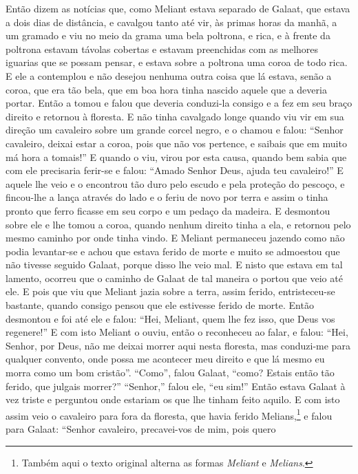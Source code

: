 Então dizem as notícias que, como Meliant estava separado de Galaat, que estava
a dois dias de distância, e cavalgou tanto até vir, às primas horas da manhã, a
um gramado e viu no meio da grama uma bela poltrona, e rica, e à frente da
poltrona estavam távolas cobertas e estavam preenchidas com as melhores
iguarias que se possam pensar, e estava sobre a poltrona uma coroa de todo
rica. E ele a contemplou e não desejou nenhuma outra coisa que lá estava, senão
a coroa, que era tão bela, que em boa hora tinha nascido aquele que a deveria
portar. Então a tomou e falou que deveria conduzi-la consigo e a fez em seu
braço direito e retornou à floresta. E não tinha cavalgado longe quando viu vir
em sua direção um cavaleiro sobre um grande corcel negro, e o chamou e falou:
“Senhor cavaleiro, deixai estar a coroa, pois que não vos pertence, e saibais
que em muito má hora a tomais!” E quando o viu, virou por esta causa, quando
bem sabia que com ele precisaria ferir-se e falou: “Amado Senhor Deus,
ajuda teu cavaleiro!” E aquele lhe veio e o encontrou tão duro pelo escudo e
pela proteção do pescoço, e fincou-lhe a lança através do lado e o feriu de
novo por terra e assim o tinha pronto que ferro ficasse em seu corpo e um
pedaço da madeira. E desmontou sobre ele e lhe tomou a coroa, quando nenhum
direito tinha a ela, e retornou pelo mesmo caminho por onde tinha vindo. 
E Meliant permaneceu jazendo como não podia levantar-se e achou que estava
ferido de morte e muito se admoestou que não tivesse seguido Galaat, porque
disso lhe veio mal. E nisto que estava em tal lamento, ocorreu que o caminho de
Galaat de tal maneira o portou que veio até ele. E pois que viu que Meliant
jazia sobre a terra, assim ferido, entristeceu-se bastante, quando consigo
pensou que ele estivesse ferido de morte. Então desmontou e foi até ele e
falou: “Hei, Meliant, quem lhe fez isso, que Deus vos regenere!” E com isto
Meliant o ouviu, então o reconheceu ao falar, e falou: “Hei, Senhor, por Deus,
não me deixai morrer aqui nesta floresta, mas conduzi-me para qualquer
convento, onde possa me acontecer meu direito e que lá mesmo eu morra como um
bom cristão”. “Como”, falou Galaat, “como? Estais então tão ferido, que julgais
morrer?” “Senhor,” falou ele, “eu sim!” Então estava Galaat à vez triste e
perguntou onde estariam os que lhe tinham feito aquilo. E com isto assim veio o
cavaleiro para fora da floresta, que havia ferido Melians,\footnote{ Também aqui
o texto original alterna as formas \textit{Meliant} e \textit{Melians}.
 } e falou para Galaat: “Senhor cavaleiro, precavei-vos de mim, pois quero
